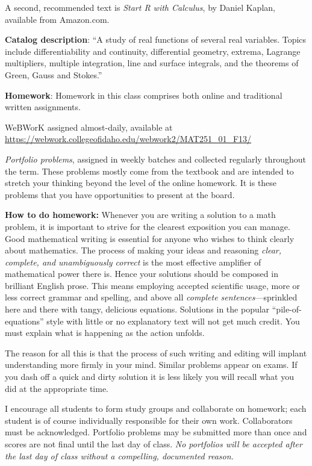 \documentclass[12pt,twoside]{amsart}
\begin{document}
A second, recommended text is \emph{Start R with Calculus}, by Daniel Kaplan, available from Amazon.com. 

\textbf{Catalog description}: ``A study of real functions of several real variables. Topics include differentiability and continuity, differential geometry, extrema, Lagrange multipliers, multiple integration, line and surface integrals, and the theorems of Green, Gauss and Stokes.''

\textbf{Homework}: Homework in this class comprises both online and traditional written assignments.
\begin{compactitem}
    \item WeBWorK assigned almost-daily, available at \\
    \url{https://webwork.collegeofidaho.edu/webwork2/MAT251_01_F13/}
    \item \emph{Portfolio problems}, assigned in weekly batches and collected regularly throughout the term. These problems mostly come from the textbook and are intended to stretch your thinking beyond the level of the online homework. It is these problems that you have opportunities to present at the board.
\end{compactitem}

\textbf{How to do homework:} Whenever you are writing a solution to a math problem, it is important to strive for the clearest exposition you can manage. Good mathematical writing is essential for anyone who wishes to think clearly about mathematics. The process of making your ideas and reasoning \emph{clear, complete, and unambiguously correct} is the most effective amplifier of mathematical power there is. Hence your solutions should be composed in brilliant English prose. This means employing accepted scientific usage, more or less correct grammar and spelling, and above all \emph{complete sentences}---sprinkled here and there with tangy, delicious equations. Solutions in the popular ``pile-of-equations'' style with little or no explanatory text will not get much credit. You must explain what is happening as the action unfolds. 

The reason for all this is that the process of such writing and editing will implant understanding more firmly in your mind. Similar problems appear on exams. If you dash off a quick and dirty solution it is less likely you will recall what you did at the appropriate time.

I encourage all students to form study groups and collaborate on homework; each student is of course individually responsible for their own work. Collaborators must be acknowledged. Portfolio problems may be submitted more than once and scores are not final until the last day of class. \emph{No portfolios will be accepted after the last day of class without a compelling, documented reason.}
\end{document}
